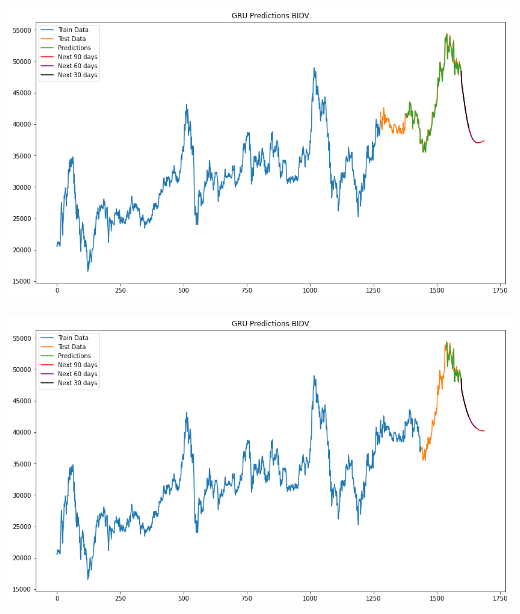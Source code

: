 \documentclass[conference]{IEEEtran}
\begin{document}
\begin{minipage}{0.23\textwidth}
    \centering
    \includegraphics[width=\linewidth]{images/GRU/GRU_BIDV_82.png}
    \label{fig:image1}
\end{minipage}
\hfill
\begin{minipage}{0.23\textwidth}
    \centering
    \includegraphics[width=\linewidth]{images/GRU/GRU_BIDV_91.png}
    \label{fig:image2}
\end{minipage}
\end{document}
